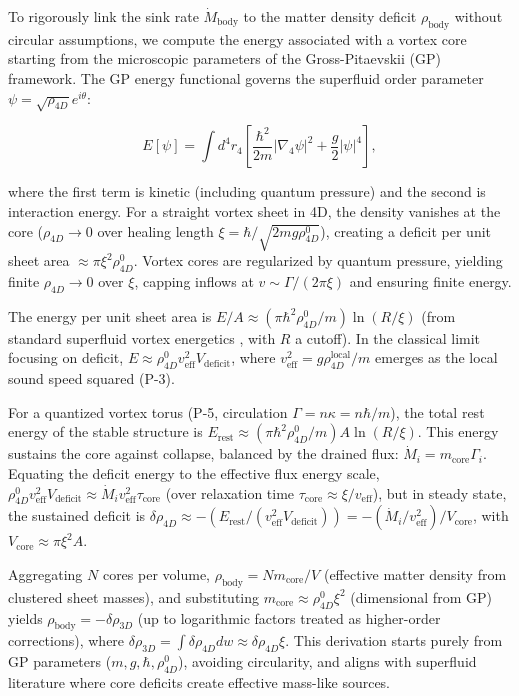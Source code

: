 \documentclass{article}
\begin{document}
To rigorously link the sink rate $\dot{M}_{\text{body}}$ to the matter density deficit $\rho_{\text{body}}$ without circular assumptions, we compute the energy associated with a vortex core starting from the microscopic parameters of the Gross-Pitaevskii (GP) framework. The GP energy functional governs the superfluid order parameter $\psi = \sqrt{\rho_{4D}} e^{i \theta}$:

\[
E[\psi] = \int d^4 r_4 \left[ \frac{\hbar^2}{2 m} |\nabla_4 \psi|^2 + \frac{g}{2} |\psi|^4 \right],
\]

where the first term is kinetic (including quantum pressure) and the second is interaction energy. For a straight vortex sheet in 4D, the density vanishes at the core ($\rho_{4D} \to 0$ over healing length $\xi = \hbar / \sqrt{2 m g \rho_{4D}^0}$), creating a deficit per unit sheet area $\approx \pi \xi^2 \rho_{4D}^0$. Vortex cores are regularized by quantum pressure, yielding finite $\rho_{4D} \to 0$ over $\xi$, capping inflows at $v \sim \Gamma / (2\pi \xi)$ and ensuring finite energy.

The energy per unit sheet area is $E / A \approx (\pi \hbar^2 \rho_{4D}^0 / m) \ln(R / \xi)$ (from standard superfluid vortex energetics \cite{onsager1949, feynman1955}, with $R$ a cutoff). In the classical limit focusing on deficit, $E \approx \rho_{4D}^0 v_{\text{eff}}^2 V_{\text{deficit}}$, where $v_{\text{eff}}^2 = g \rho_{4D}^{\text{local}} / m$ emerges as the local sound speed squared (P-3).

For a quantized vortex torus (P-5, circulation $\Gamma = n \kappa = n \hbar / m$), the total rest energy of the stable structure is $E_{\text{rest}} \approx (\pi \hbar^2 \rho_{4D}^0 / m) A \ln(R / \xi)$. This energy sustains the core against collapse, balanced by the drained flux: $\dot{M}_i = m_{\text{core}} \Gamma_i$. Equating the deficit energy to the effective flux energy scale, $\rho_{4D}^0 v_{\text{eff}}^2 V_{\text{deficit}} \approx \dot{M}_i v_{\text{eff}}^2 \tau_{\text{core}}$ (over relaxation time $\tau_{\text{core}} \approx \xi / v_{\text{eff}}$), but in steady state, the sustained deficit is $\delta \rho_{4D} \approx - (E_{\text{rest}} / (v_{\text{eff}}^2 V_{\text{deficit}})) = - (\dot{M}_i / v_{\text{eff}}^2) / V_{\text{core}}$, with $V_{\text{core}} \approx \pi \xi^2 A$.

Aggregating $N$ cores per volume, $\rho_{\text{body}} = N m_{\text{core}} / V$ (effective matter density from clustered sheet masses), and substituting $m_{\text{core}} \approx \rho_{4D}^0 \xi^2$ (dimensional from GP) yields $\rho_{\text{body}} = - \delta \rho_{3D}$ (up to logarithmic factors treated as higher-order corrections), where $\delta \rho_{3D} = \int \delta \rho_{4D} dw \approx \delta \rho_{4D} \xi$. This derivation starts purely from GP parameters ($m, g, \hbar, \rho_{4D}^0$), avoiding circularity, and aligns with superfluid literature where core deficits create effective mass-like sources.
\end{document}
